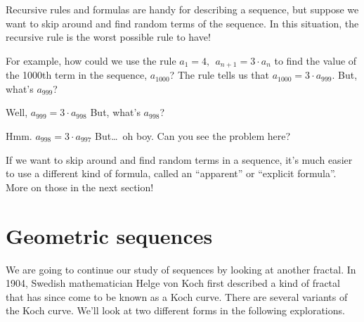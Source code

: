 Recursive rules and formulas are handy for describing a sequence, but suppose we want to skip around and find random terms of the sequence. In this situation, the recursive rule is the worst possible rule to have!

For example, how could we use the rule $a_1 = 4, ~~ a_{n+1} = 3 \cdot a_n$ to find the value of the 1000th term in the sequence, $a_{1000}$? The rule tells us that $a_{1000} = 3 \cdot a_{999}$. But, what's $a_{999}$?

Well, $a_{999} = 3 \cdot a_{998}$ But, what's $a_{998}$?

Hmm. $a_{998} = 3 \cdot a_{997}$ But\ldots\ oh boy. Can you see the problem here?

If we want to skip around and find random terms in a sequence, it's much easier to use a different kind of formula, called an ``apparent'' or ``explicit formula''. More on those in the next section!


\section{Geometric sequences}
\label{sec:geometricseq}

We are going to continue our study of sequences by looking at another fractal. In 1904, Swedish mathematician Helge von Koch first described a kind of fractal that has since come to be known as a Koch curve. There are several variants of the Koch curve. We'll look at two different forms in the following explorations.

\begin{boxedexplore}
\end{boxedexplore}

